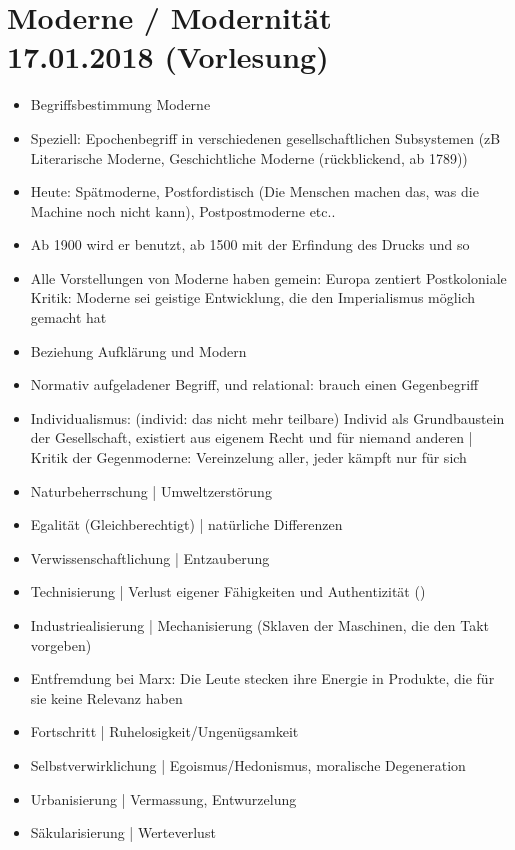 \documentclass[emulatestandardclasses]{scrartcl}
\begin{document}
\section{Moderne / Modernität\\17.01.2018 (Vorlesung)}

\begin{itemize}
  \item Begriffsbestimmung Moderne
  \item Speziell: Epochenbegriff in verschiedenen gesellschaftlichen Subsystemen (zB Literarische Moderne, Geschichtliche Moderne (rückblickend, ab 1789)) 
  \item Heute: Spätmoderne, Postfordistisch (Die Menschen machen das, was die Machine noch nicht kann), Postpostmoderne etc..
  \item Ab 1900 wird er benutzt, ab 1500 mit der Erfindung des Drucks und so
  \item Alle Vorstellungen von Moderne haben gemein: Europa zentiert Postkoloniale Kritik: Moderne sei geistige Entwicklung, die den Imperialismus möglich gemacht hat
  \item Beziehung Aufklärung und Modern
  \item Normativ aufgeladener Begriff, und relational: brauch einen Gegenbegriff
  \item Individualismus: (individ: das nicht mehr teilbare) Individ als Grundbaustein der Gesellschaft, existiert aus eigenem Recht und für niemand anderen | Kritik der Gegenmoderne: Vereinzelung aller, jeder kämpft nur für sich
  \item Naturbeherrschung | Umweltzerstörung
  \item Egalität (Gleichberechtigt) | natürliche Differenzen
  \item Verwissenschaftlichung | Entzauberung
  \item Technisierung | Verlust eigener Fähigkeiten und Authentizität ()
  \item Industriealisierung | Mechanisierung (Sklaven der Maschinen, die den Takt vorgeben)
  \item Entfremdung bei Marx: Die Leute stecken ihre Energie in Produkte, die für sie keine Relevanz haben
  \item Fortschritt | Ruhelosigkeit/Ungenügsamkeit
  \item Selbstverwirklichung | Egoismus/Hedonismus, moralische Degeneration
  \item Urbanisierung | Vermassung, Entwurzelung
  \item Säkularisierung | Werteverlust

\end{itemize}
\end{document}
